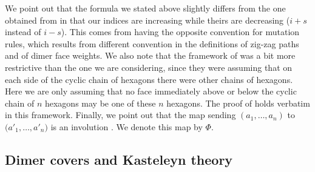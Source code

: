 \documentclass[pdftex]{sigma}
\numberwithin{equation}{section}
\begin{document}
	
	We point out that the formula we stated above slightly differs from the one obtained from \cite{ILP1} in that our indices are increasing while theirs are decreasing ($i+s$ instead of $i-s$). This comes from having the opposite convention for mutation rules, which results from different convention in the definitions of zig-zag paths and of dimer face weights. We also note that the framework of \cite{ILP1} was a bit more restrictive than the one we are considering, since they were assuming that on each side of the cyclic chain of hexagons there were other chains of hexagons. Here we are only assuming that no face immediately above or below the cyclic chain of $n$ hexagons may be one of these $n$ hexagons. The proof of \cite{ILP1} holds verbatim in this framework. Finally, we point out that the map sending $(a_1,\dots,a_n)$ to $\big(a'_1,\dots,a'_n\big)$ is an involution \cite{ILP1}. We denote this map by $\Phi$.
	
	\subsection{Dimer covers and Kasteleyn theory}
	
\end{document}
